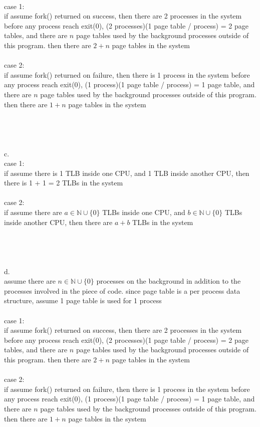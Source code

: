 \documentclass[12pt, border = 4pt, multi]{article} %
\begin{document}
\\
case 1:\\
if assume fork() returned on success, then there are 2 processes in the system before any process reach exit(0), (2 processes)(1 page table / process) = 2 page tables, and there are $n$ page tables used by the background processes outside of this program. then there are $2 + n$ page tables in the system\\
\\
case 2:\\
if assume fork() returned on failure, then there is 1 process in the system before any process reach exit(0), (1 process)(1 page table / process) = 1 page table, and there are $n$ page tables used by the background processes outside of this program. then there are $1 + n$ page tables in the system\\
\\
\\
\\
\\
c.\\
case 1:\\
if assume there is 1 TLB inside one CPU, and 1 TLB inside another CPU, then there is 1 + 1 = 2 TLBs in the system\\
\\
case 2:\\
if assume there are $a \in \mathbb{N} \cup \{0\}$ TLBs inside one CPU, and $b \in \mathbb{N} \cup \{0\}$ TLBs inside another CPU, then there are $a + b$ TLBs in the system\\
\\
\\
\\
\\
d.\\
assume there are $n \in \mathbb{N} \cup \{0\}$ processes on the background in addition to the processes involved in the piece of code. since page table is a per process data structure, assume 1 page table is used for 1 process\\
\\
case 1:\\
if assume fork() returned on success, then there are 2 processes in the system before any process reach exit(0), (2 processes)(1 page table / process) = 2 page tables, and there are $n$ page tables used by the background processes outside of this program. then there are $2 + n$ page tables in the system\\
\\
case 2:\\
if assume fork() returned on failure, then there is 1 process in the system before any process reach exit(0), (1 process)(1 page table / process) = 1 page table, and there are $n$ page tables used by the background processes outside of this program. then there are $1 + n$ page tables in the system\\
\end{document}
